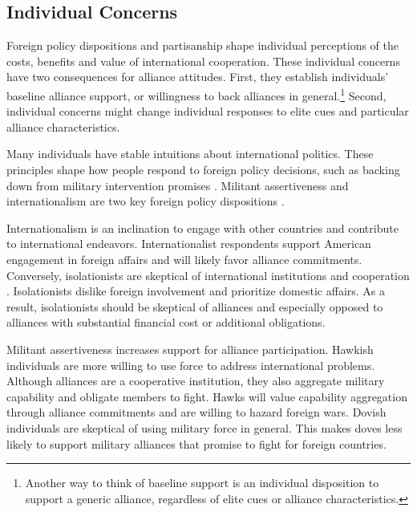 \documentclass[12pt]{article}
\begin{document}
\subsection{Individual Concerns}


Foreign policy dispositions and partisanship shape individual perceptions of the costs, benefits and value of international cooperation. 
These individual concerns have two consequences for alliance attitudes. 
First, they establish individuals' baseline alliance support, or willingness to back alliances in general.\footnote{Another way to think of baseline support is an individual disposition to support a generic alliance, regardless of elite cues or alliance characteristics.} 
Second, individual concerns might change individual responses to elite cues and particular alliance characteristics. 


Many individuals have stable intuitions about international politics. 
These principles shape how people respond to foreign policy decisions, such as backing down from military intervention promises \citep{KertzerBrutger2016}. 
Militant assertiveness and internationalism are two key foreign policy dispositions \citep{Herrmannetal1999}.  


Internationalism is an inclination to engage with other countries and contribute to international endeavors. 
Internationalist respondents support American engagement in foreign affairs and will likely favor alliance commitments. 
Conversely, isolationists are skeptical of international institutions and cooperation \citep{Kertzer2013}. 
Isolationists dislike foreign involvement and prioritize domestic affairs. 
As a result, isolationists should be skeptical of alliances and especially opposed to alliances with substantial financial cost or additional obligations. 


Militant assertiveness increases support for alliance participation. 
Hawkish individuals are more willing to use force to address international problems. 
Although alliances are a cooperative institution, they also aggregate military capability \citep{FordhamPoast2014} and obligate members to fight.
Hawks will value capability aggregation through alliance commitments and are willing to hazard foreign wars.  
Dovish individuals are skeptical of using military force in general.
This makes doves less likely to support military alliances that promise to fight for foreign countries.  
\end{document}
